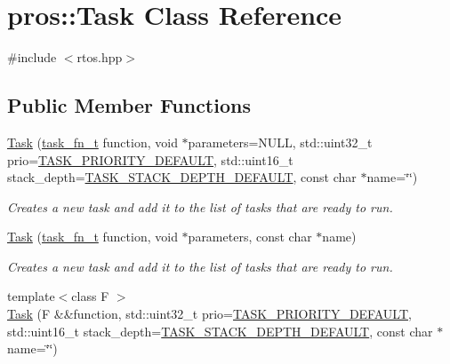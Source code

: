 \hypertarget{classpros_1_1Task}{}\section{pros\+:\+:Task Class Reference}
\label{classpros_1_1Task}


{\ttfamily \#include $<$rtos.\+hpp$>$}

\subsection*{Public Member Functions}
\begin{DoxyCompactItemize}
\item 
\hyperlink{classpros_1_1Task_a938ee60b49f29d743315bf05ee9f4a56}{Task} (\hyperlink{rtos_8h_aece0aa29b1f1538115228d2197239f98}{task\+\_\+fn\+\_\+t} function, void $\ast$parameters=N\+U\+LL, std\+::uint32\+\_\+t prio=\hyperlink{rtos_8h_a3082a7e8f15691441dba683711bb823f}{T\+A\+S\+K\+\_\+\+P\+R\+I\+O\+R\+I\+T\+Y\+\_\+\+D\+E\+F\+A\+U\+LT}, std\+::uint16\+\_\+t stack\+\_\+depth=\hyperlink{rtos_8h_a9ffb33b9e3714ca949d9f45dde3cbf8f}{T\+A\+S\+K\+\_\+\+S\+T\+A\+C\+K\+\_\+\+D\+E\+P\+T\+H\+\_\+\+D\+E\+F\+A\+U\+LT}, const char $\ast$name=\char`\"{}\char`\"{})
\begin{DoxyCompactList}\small\item\em Creates a new task and add it to the list of tasks that are ready to run. \end{DoxyCompactList}\item 
\hyperlink{classpros_1_1Task_a64608b28832c40cf11ddb350a7331a08}{Task} (\hyperlink{rtos_8h_aece0aa29b1f1538115228d2197239f98}{task\+\_\+fn\+\_\+t} function, void $\ast$parameters, const char $\ast$name)
\begin{DoxyCompactList}\small\item\em Creates a new task and add it to the list of tasks that are ready to run. \end{DoxyCompactList}\item 
{\footnotesize template$<$class F $>$ }\\\hyperlink{classpros_1_1Task_a6574af1a29f3031904fc75bf67563c00}{Task} (F \&\&function, std\+::uint32\+\_\+t prio=\hyperlink{rtos_8h_a3082a7e8f15691441dba683711bb823f}{T\+A\+S\+K\+\_\+\+P\+R\+I\+O\+R\+I\+T\+Y\+\_\+\+D\+E\+F\+A\+U\+LT}, std\+::uint16\+\_\+t stack\+\_\+depth=\hyperlink{rtos_8h_a9ffb33b9e3714ca949d9f45dde3cbf8f}{T\+A\+S\+K\+\_\+\+S\+T\+A\+C\+K\+\_\+\+D\+E\+P\+T\+H\+\_\+\+D\+E\+F\+A\+U\+LT}, const char $\ast$name=\char`\"{}\char`\"{})

\end{DoxyCompactItemize}
